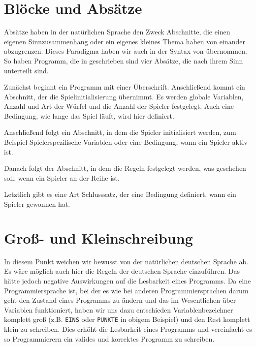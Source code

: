     \section{Blöcke und Absätze}
    \label{sec:blocke_und_absatze}
     Absätze haben in der natürlichen Sprache den Zweck Abschnitte, die einen eigenen Sinnzusammenhang oder ein eigenes kleines Thema haben von einander abzugrenzen. Dieses Paradigma haben wir auch in der Syntax von \dg übernommen. So haben Programm, die in \dg geschrieben sind vier Absätze, die nach ihrem Sinn unterteilt sind.
 
     Zunächst beginnt ein Programm mit einer Überschrift. Anschließend kommt ein Abschnitt, der die Spielinitialisierung übernimmt. Es werden globale Variablen, Anzahl und Art der Würfel und die Anzahl der Spieler festgelegt. Auch eine Bedingung, wie lange das Spiel läuft, wird hier definiert.
 
     Anschließend folgt ein Abschnitt, in dem die Spieler initialisiert werden, zum Beispiel Spielerspezifische Variablen oder eine Bedingung, wann ein Spieler aktiv ist.
 
     Danach folgt der Abschnitt, in dem die Regeln festgelegt werden, was geschehen soll, wenn ein Spieler an der Reihe ist.
 
     Letztlich gibt es eine Art Schlusssatz, der eine Bedingung definiert, wann ein Spieler gewonnen hat.
 
    \section{Groß- und Kleinschreibung}
    \label{sec:gross_und_kleinschreibung}
     In diesem Punkt weichen wir bewusst von der natürlichen deutschen Sprache ab. Es wäre möglich auch hier die Regeln der deutschen Sprache einzuführen. Das hätte jedoch negative Auswirkungen auf die Lesbarkeit eines Programms. Da \dg eine Programmiersprache ist, bei der es wie bei anderen Programmiersprachen darum geht den Zustand eines Programms zu ändern und das im Wesentlichen über Variablen funktioniert, haben wir uns dazu entschieden Variablenbezeichner komplett groß (z.B. \texttt{EINS} oder \texttt{PUNKTE} in obigem Beispiel) und den Rest komplett klein zu schreiben. Dies erhöht die Lesbarkeit eines Programms und vereinfacht es so Programmierern ein valides und korrektes Programm zu schreiben.
	
    
